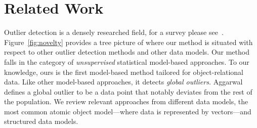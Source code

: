 \documentclass[conference]{IEEEtran}
\begin{document}
			
\section{Related Work}
Outlier detection is a densely researched field, for a survey please see~\cite{aggarwal2013}.
Figure~\ref{fig:novelty} provides a tree picture of where our method is situated with respect to other outlier detection methods and other data models. 
Our method falls in the category of {\em unsupervised} statistical model-based approaches. To our knowledge, ours is the first model-based method tailored for object-relational data. Like other model-based approaches, it detects {\em global outliers.} Aggarwal \cite{aggarwal2013} defines a global outlier to be a data point that notably deviates from the rest of the population. We review relevant approaches from different data models, the most common atomic object model---where data is represented by vectors---and structured data models.\\
\end{document}
